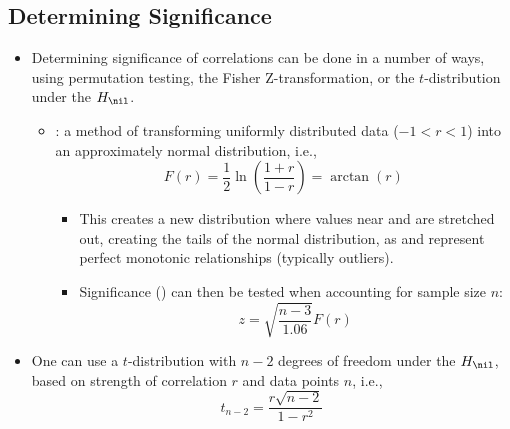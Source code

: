 \begin{itemize}
  \subsection{Determining Significance}
  \begin{itemize}
    \item Determining significance of correlations can be done in a number of ways, using permutation testing, the Fisher Z-transformation, or the \(t\)-distribution under the \(H_\nil\).
    \begin{itemize}
      \item {}: a method of transforming uniformly distributed data (\(-1 < r < 1\)) into an approximately normal distribution, i.e.,
      \[%
      F(r) = \frac{1}{2}\ln\left(\frac{1+r}{1-r}\right) = \arctan(r)
      \]%
      \begin{itemize}
        \item This creates a new distribution where values near  and  are stretched out, creating the tails of the normal distribution, as  and  represent perfect monotonic relationships (typically outliers). 
        \item Significance (\hyperref[Subsection: Z-Score Standardization]{}) can then be tested when accounting for sample size \(n\):
        \[%
        z = \sqrt{\frac{n-3}{1.06}}F(r)
        \]%
      \end{itemize}
    \end{itemize}
    \item One can use a \(t\)-distribution with \(n-2\) degrees of freedom under the \(H_\nil\), based on strength of correlation \(r\) and data points \(n\), i.e.,
      \[%
      t_{n-2} = \frac{r\sqrt{n-2}}{1-r^2}        
      \]%
  \end{itemize}
  

\end{itemize}
